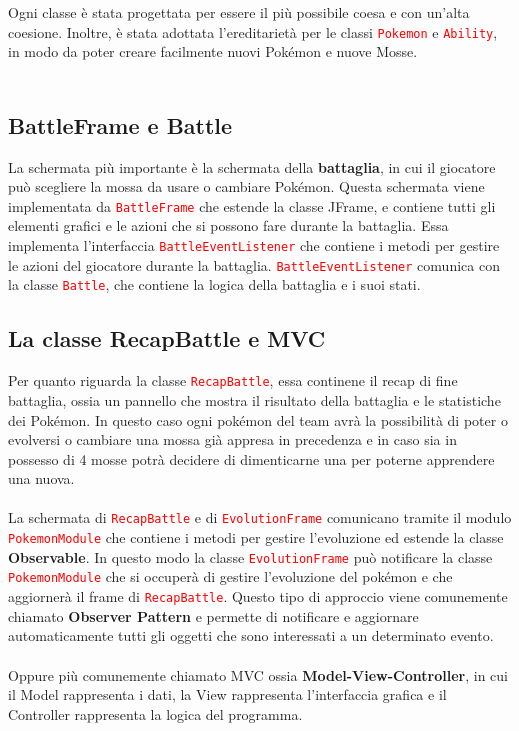 \documentclass[12pt]{article}
\begin{document}
\par\medskip\noindent
Ogni classe è stata progettata per essere il più possibile coesa e con un'alta coesione. Inoltre, è stata adottata l'ereditarietà per le classi \texttt{\textcolor{red}{Pokemon}} e \texttt{\textcolor{red}{Ability}}, in modo da poter creare facilmente nuovi Pokémon e nuove Mosse.
\\ \\
\subsection{BattleFrame e Battle}
La schermata più importante è la schermata della \textbf{battaglia}, in cui il giocatore può scegliere la mossa da usare o cambiare Pokémon. Questa schermata viene implementata da \texttt{\textcolor{red}{BattleFrame}} che estende la classe JFrame, e contiene tutti gli elementi grafici e le azioni che si possono fare durante la battaglia.
Essa implementa l'interfaccia \texttt{\textcolor{red}{BattleEventListener}} che contiene i metodi per gestire le azioni del giocatore durante la battaglia. \texttt{\textcolor{red}{BattleEventListener}} comunica con la classe \texttt{\textcolor{red}{Battle}}, che contiene la logica della battaglia e i suoi stati.
\subsection{La classe RecapBattle e MVC}
Per quanto riguarda la classe \texttt{\textcolor{red}{RecapBattle}}, essa continene il recap di fine battaglia, ossia un pannello che mostra il risultato della battaglia e le statistiche dei Pokémon.
In questo caso ogni pokémon del team avrà la possibilità di poter o evolversi o cambiare una mossa già appresa in precedenza e in caso sia in possesso di 4 mosse potrà decidere di dimenticarne una per poterne apprendere una nuova.
\\ \\
La schermata di \texttt{\textcolor{red}{RecapBattle}} e di \texttt{\textcolor{red}{EvolutionFrame}} comunicano tramite il modulo \texttt{\textcolor{red}{PokemonModule}} che contiene i metodi per gestire l'evoluzione ed estende la classe \textbf{Observable}.
In questo modo la classe \texttt{\textcolor{red}{EvolutionFrame}} può notificare la classe \texttt{\textcolor{red}{PokemonModule}} che si occuperà di gestire l'evoluzione del pokémon e che aggiornerà il frame di \texttt{\textcolor{red}{RecapBattle}}.
Questo tipo di approccio viene comunemente chiamato \textbf{Observer Pattern} e permette di notificare e aggiornare automaticamente tutti gli oggetti che sono interessati a un determinato evento.
\\ \\
Oppure più comunemente chiamato MVC ossia \textbf{Model-View-Controller}, in cui il Model rappresenta i dati, la View rappresenta l'interfaccia grafica e il Controller rappresenta la logica del programma.
\end{document}
